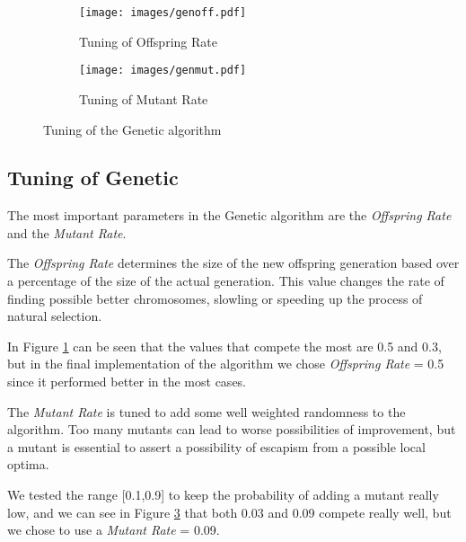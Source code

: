 
\begin{figure}[!h]
    \centering
        \begin{subfigure}{0.48\textwidth} %
            \texttt{[image: images/genoff.pdf]} 
            \caption{Tuning of Offspring Rate}
            \label{fig:genoff}
        \end{subfigure}
        \begin{subfigure}{0.48\textwidth}
            \texttt{[image: images/genmut.pdf]}
            \caption{Tuning of Mutant Rate}
            \label{fig:genmut}
        \end{subfigure}
    \caption{Tuning of the Genetic algorithm}
    \end{figure}

\subsection{Tuning of Genetic}

The most important parameters in the Genetic algorithm are the \textit{Offspring Rate} and the \textit{Mutant Rate}.

The \textit{Offspring Rate} determines the size of the new offspring generation based over a percentage of the size of the actual generation. This value changes the rate of finding possible better chromosomes, slowling or speeding up the process of natural selection.

In Figure \ref{fig:genoff} can be seen that the values that compete the most are 0.5 and 0.3, but in the final implementation of the algorithm we chose \textit{Offspring Rate} = 0.5 since it performed better in the most cases.


The \textit{Mutant Rate} is tuned to add some well weighted randomness to the algorithm. Too many mutants can lead to worse possibilities of improvement, but a mutant is essential to assert a possibility of escapism from a possible local optima. 

We tested the range [0.1,0.9] to keep the probability of adding a mutant really low, and we can see in Figure \ref{fig:genmut} that both 0.03 and 0.09 compete really well, but we chose to use a \textit{Mutant Rate} = 0.09.



